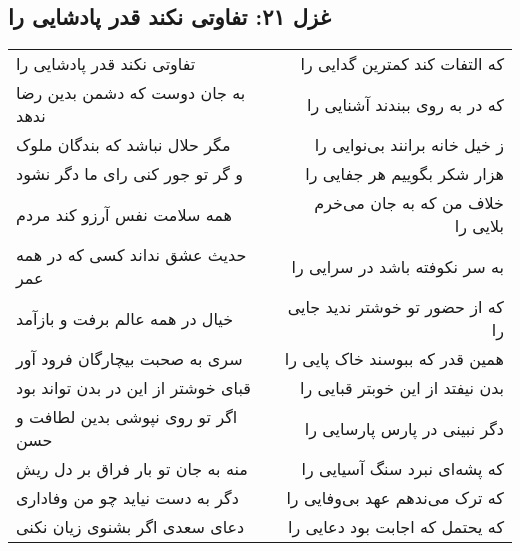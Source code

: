\begin{center}
\section*{غزل ۲۱: تفاوتی نکند قدر پادشایی را}
\label{sec:021}
\begin{longtable}{l p{0.5cm} r}
تفاوتی نکند قدر پادشایی را
&&
که التفات کند کمترین گدایی را
\\
به جان دوست که دشمن بدین رضا ندهد
&&
که در به روی ببندند آشنایی را
\\
مگر حلال نباشد که بندگان ملوک
&&
ز خیل خانه برانند بی‌نوایی را
\\
و گر تو جور کنی رای ما دگر نشود
&&
هزار شکر بگوییم هر جفایی را
\\
همه سلامت نفس آرزو کند مردم
&&
خلاف من که به جان می‌خرم بلایی را
\\
حدیث عشق نداند کسی که در همه عمر
&&
به سر نکوفته باشد در سرایی را
\\
خیال در همه عالم برفت و بازآمد
&&
که از حضور تو خوشتر ندید جایی را
\\
سری به صحبت بیچارگان فرود آور
&&
همین قدر که ببوسند خاک پایی را
\\
قبای خوشتر از این در بدن تواند بود
&&
بدن نیفتد از این خوبتر قبایی را
\\
اگر تو روی نپوشی بدین لطافت و حسن
&&
دگر نبینی در پارس پارسایی را
\\
منه به جان تو بار فراق بر دل ریش
&&
که پشه‌ای نبرد سنگ آسیایی را
\\
دگر به دست نیاید چو من وفاداری
&&
که ترک می‌ندهم عهد بی‌وفایی را
\\
دعای سعدی اگر بشنوی زیان نکنی
&&
که یحتمل که اجابت بود دعایی را
\\
\end{longtable}
\end{center}
